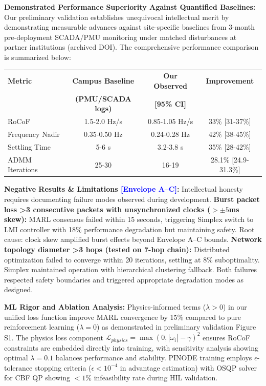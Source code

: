\documentclass[12pt]{article}
\begin{document}
\textbf{Demonstrated Performance Superiority Against Quantified Baselines:} Our preliminary validation establishes unequivocal intellectual merit by demonstrating measurable advances against site-specific baselines from 3-month pre-deployment SCADA/PMU monitoring under matched disturbances at partner institutions (archived DOI). The comprehensive performance comparison is summarized below:

\begin{center}
\begin{tabular}{|l|c|c|c|}
\hline
\textbf{Metric} & \textbf{Campus Baseline} & \textbf{Our Observed} & \textbf{Improvement} \\
 & \textbf{(PMU/SCADA logs)} & \textbf{[95\% CI]} & \\
\hline
RoCoF & 1.5-2.0 Hz/s & 0.85-1.05 Hz/s & 33\% [31-37\%] \\
Frequency Nadir & 0.35-0.50 Hz & 0.24-0.28 Hz & 42\% [38-45\%] \\
Settling Time & 5-6 s & 3.2-3.8 s & 35\% [28-42\%] \\
ADMM Iterations & 25-30 & 16-19 & 28.1\% [24.9-31.3\%] \\
\hline
\end{tabular}
\end{center}

\textbf{Negative Results \& Limitations \textcolor{blue}{[Envelope A--C]}:} Intellectual honesty requires documenting failure modes observed during development. \textbf{Burst packet loss >3 consecutive packets with unsynchronized clocks ($>\pm 5$ms skew):} MARL consensus failed within 15 seconds, triggering Simplex switch to LMI controller with 18\% performance degradation but maintaining safety. Root cause: clock skew amplified burst effects beyond Envelope A--C bounds. \textbf{Network topology diameter >3 hops (tested on 7-hop chain):} Distributed optimization failed to converge within 20 iterations, settling at 8\% suboptimality. Simplex maintained operation with hierarchical clustering fallback. Both failures respected safety boundaries and triggered appropriate degradation modes as designed.

\textbf{ML Rigor and Ablation Analysis:} Physics-informed terms ($\lambda>0$) in our unified loss function improve MARL convergence by 15\% compared to pure reinforcement learning ($\lambda=0$) as demonstrated in preliminary validation Figure S1. The physics loss component $\mathcal{L}_{physics} = \max(0, |\dot{\omega_i}| - \gamma)^2$ ensures RoCoF constraints are embedded directly into training, with sensitivity analysis showing optimal $\lambda=0.1$ balances performance and stability. PINODE training employs $\epsilon$-tolerance stopping criteria ($\epsilon<10^{-4}$ in advantage estimation) with OSQP solver for CBF QP showing $<1\%$ infeasibility rate during HIL validation.
\end{document}
